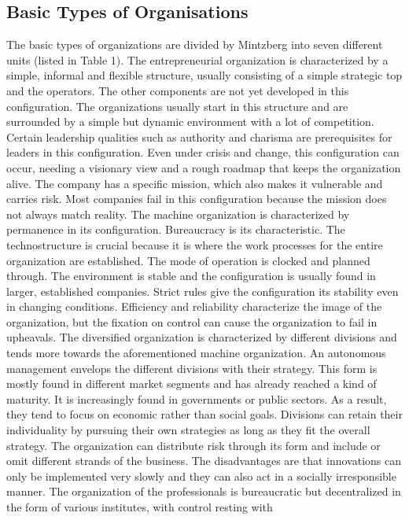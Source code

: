 \documentclass[a4paper,12pt]{article}
\begin{document}
\subsection{Basic Types of Organisations}

The basic types of organizations are divided by Mintzberg into seven different
units (listed in Table 1). The entrepreneurial organization is characterized
by a simple, informal and flexible structure, usually consisting of a simple
strategic top and the operators. The other components are not yet developed in
this configuration. The organizations usually start in this structure and are
surrounded by a simple but dynamic environment with a lot of
competition. Certain leadership qualities such as authority and charisma are
prerequisites for leaders in this configuration. Even under crisis and change,
this configuration can occur, needing a visionary view and a rough roadmap
that keeps the organization alive. The company has a specific mission, which
also makes it vulnerable and carries risk. Most companies fail in this
configuration because the mission does not always match reality. The machine
organization is characterized by permanence in its configuration. Bureaucracy
is its characteristic. The technostructure is crucial because it is where the
work processes for the entire organization are established. The mode of
operation is clocked and planned through. The environment is stable and the
configuration is usually found in larger, established companies. Strict rules
give the configuration its stability even in changing conditions. Efficiency
and reliability characterize the image of the organization, but the fixation
on control can cause the organization to fail in upheavals. The diversified
organization is characterized by different divisions and tends more towards
the aforementioned machine organization. An autonomous management envelops the
different divisions with their strategy. This form is mostly found in
different market segments and has already reached a kind of maturity. It is
increasingly found in governments or public sectors. As a result, they tend to
focus on economic rather than social goals. Divisions can retain their
individuality by pursuing their own strategies as long as they fit the overall
strategy. The organization can distribute risk through its form and include or
omit different strands of the business. The disadvantages are that innovations
can only be implemented very slowly and they can also act in a socially
irresponsible manner. The organization of the professionals is bureaucratic
but decentralized in the form of various institutes, with control resting with
\end{document}
